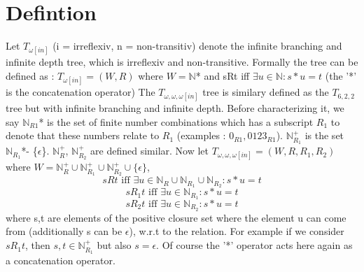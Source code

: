 \documentclass[12pt, a4paper]{scrreprt}
\begin{document}
\section{Defintion}
Let $T_{\omega [in]}$ (i = irreflexiv, n = non-transitiv) denote the infinite branching and infinite depth tree, which is irreflexiv and non-transitive.
Formally the tree can be defined as : $T_{\omega [in]} = (W, R)$ where $W = \mathbb{N}$* and sRt iff $\exists u \in \mathbb{N} : s*u = t$ (the '*' is the concatenation operator) \newline \newline
The $T_{\omega,\omega,\omega [in]}$ tree is similary defined as the $T_{6,2,2}$ tree but with infinite branching and infinite depth. Before characterizing it, we say
$\mathbb{N}_{R1}$* is the set of finite number combinations which has a subscript $R_1$ to denote that these numbers relate to $R_1$  \newline 
(examples : $0_{R1}, 0123_{R1}$).
$\mathbb{N}^+_{R_1}$ is the set $\mathbb{N}_{R_1}$*- \{$\epsilon$\}. $\mathbb{N}^+_{R}$, $\mathbb{N}^+_{R_2}$ are defined similar. \newline \newline
Now let $T_{\omega,\omega,\omega [in]} = (W, R, R_1, R_2 )$ where $W = \mathbb{N}^+_{R} \cup \mathbb{N}^+_{R_1} \cup \mathbb{N}^+_{R_2} \cup \{ \epsilon\}$, 
$$sRt \mbox{ iff } \exists u \in \mathbb{N}_{R} \cup \mathbb{N}_{R_1} \cup \mathbb{N}_{R_2} : s*u = t$$
$$sR_1t \mbox { iff } \exists u \in \mathbb{N}_{R_1} : s * u = t$$
$$sR_2t \mbox { iff } \exists u \in \mathbb{N}_{R_2} : s * u = t$$
where s,t are elements of the positive closure set where the element u can come from (additionally s can be $\epsilon$), w.r.t to the relation. For example
if we consider $sR_1t$, then $s,t \in \mathbb{N}^+_{R_1}$ but also $s = \epsilon$. Of course the '*' operator acts here again as a concatenation operator.
\end{document}
